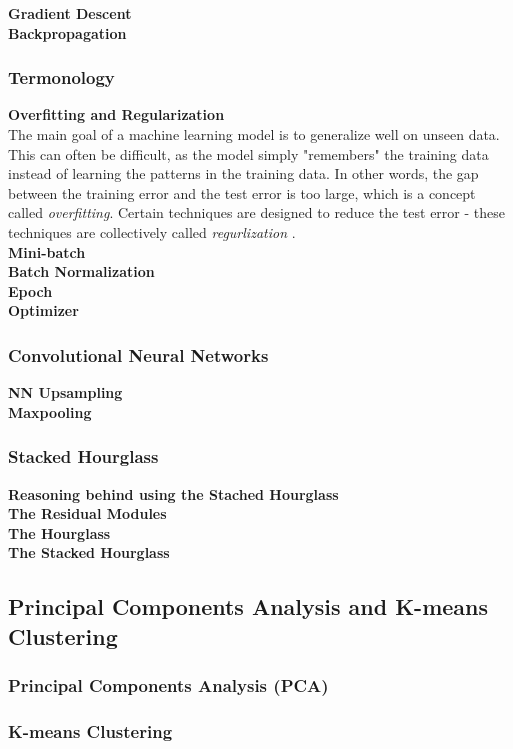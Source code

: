 \documentclass[main.tex]{subfiles}
\begin{document}
\noindent \textbf{Gradient Descent} \\
\noindent \textbf{Backpropagation} \\


\subsubsection{Termonology}
\textbf{Overfitting and Regularization} \\
The main goal of a machine learning model is to generalize well on unseen data. This can often be difficult, as the model simply "remembers" the training data instead of learning the patterns in the training data. In other words, the gap between the training error and the test error is too large, which is a concept called \textit{overfitting}. Certain techniques are designed to reduce the test error - these techniques are collectively called \textit{regurlization} \cite{DeepLearning}. \\
\textbf{Mini-batch} \\
\textbf{Batch Normalization} \\
\textbf{Epoch} \\
\textbf{Optimizer} \\
\subsubsection{Convolutional Neural Networks}
\textbf{NN Upsampling} \\
\textbf{Maxpooling}
\subsubsection{Stacked Hourglass}
\textbf{Reasoning behind using the Stached Hourglass} \\
\textbf{The Residual Modules}\\
\textbf{The Hourglass}\\
\textbf{The Stacked Hourglass}

\subsection{Principal Components Analysis and K-means Clustering}
\subsubsection{Principal Components Analysis (PCA)}
\subsubsection{K-means Clustering}
\end{document}
